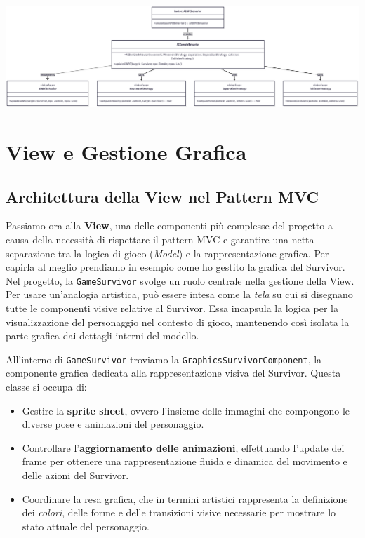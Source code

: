 \documentclass[a4paper,12pt]{report}
\begin{document}
\bigskip

\begin{center}
\includegraphics[width=1.0\textwidth]{img/NPCBehavior.png}
\end{center}
\chapter{View e Gestione Grafica}

\section{Architettura della View nel Pattern MVC}

Passiamo ora alla \textbf{View}, una delle componenti più complesse del progetto a causa della necessità di rispettare il pattern MVC e garantire una netta separazione tra la logica di gioco (\textit{Model}) e la rappresentazione grafica.
Per capirla al meglio prendiamo in esempio come ho gestito la grafica del Survivor.
Nel progetto, la \texttt{GameSurvivor} svolge un ruolo centrale nella gestione della View. Per usare un’analogia artistica, può essere intesa come la \emph{tela} su cui si disegnano tutte le componenti visive relative al Survivor. Essa incapsula la logica per la visualizzazione del personaggio nel contesto di gioco, mantenendo così isolata la parte grafica dai dettagli interni del modello.

All’interno di \texttt{GameSurvivor} troviamo la \texttt{GraphicsSurvivorComponent}, la componente grafica dedicata alla rappresentazione visiva del Survivor. Questa classe si occupa di:

\begin{itemize}
    \item Gestire la \textbf{sprite sheet}, ovvero l’insieme delle immagini che compongono le diverse pose e animazioni del personaggio.
    \item Controllare l’\textbf{aggiornamento delle animazioni}, effettuando l’update dei frame per ottenere una rappresentazione fluida e dinamica del movimento e delle azioni del Survivor.
    \item Coordinare la resa grafica, che in termini artistici rappresenta la definizione dei \emph{colori}, delle forme e delle transizioni visive necessarie per mostrare lo stato attuale del personaggio.
\end{itemize}
\end{document}
